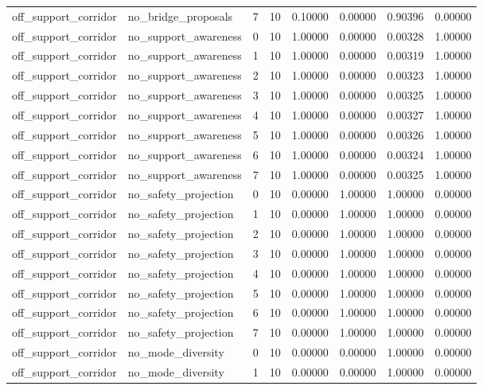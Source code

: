 \documentclass{article}
\begin{document}
\begin{table}[tbp]
{\begin{tabular}{llllllll}
off\_support\_corridor & no\_bridge\_proposals & 7 & 10 & 0.10000 & 0.00000 & 0.90396 & 0.00000 \\
off\_support\_corridor & no\_support\_awareness & 0 & 10 & 1.00000 & 0.00000 & 0.00328 & 1.00000 \\
off\_support\_corridor & no\_support\_awareness & 1 & 10 & 1.00000 & 0.00000 & 0.00319 & 1.00000 \\
off\_support\_corridor & no\_support\_awareness & 2 & 10 & 1.00000 & 0.00000 & 0.00323 & 1.00000 \\
off\_support\_corridor & no\_support\_awareness & 3 & 10 & 1.00000 & 0.00000 & 0.00325 & 1.00000 \\
off\_support\_corridor & no\_support\_awareness & 4 & 10 & 1.00000 & 0.00000 & 0.00327 & 1.00000 \\
off\_support\_corridor & no\_support\_awareness & 5 & 10 & 1.00000 & 0.00000 & 0.00326 & 1.00000 \\
off\_support\_corridor & no\_support\_awareness & 6 & 10 & 1.00000 & 0.00000 & 0.00324 & 1.00000 \\
off\_support\_corridor & no\_support\_awareness & 7 & 10 & 1.00000 & 0.00000 & 0.00325 & 1.00000 \\
off\_support\_corridor & no\_safety\_projection & 0 & 10 & 0.00000 & 1.00000 & 1.00000 & 0.00000 \\
off\_support\_corridor & no\_safety\_projection & 1 & 10 & 0.00000 & 1.00000 & 1.00000 & 0.00000 \\
off\_support\_corridor & no\_safety\_projection & 2 & 10 & 0.00000 & 1.00000 & 1.00000 & 0.00000 \\
off\_support\_corridor & no\_safety\_projection & 3 & 10 & 0.00000 & 1.00000 & 1.00000 & 0.00000 \\
off\_support\_corridor & no\_safety\_projection & 4 & 10 & 0.00000 & 1.00000 & 1.00000 & 0.00000 \\
off\_support\_corridor & no\_safety\_projection & 5 & 10 & 0.00000 & 1.00000 & 1.00000 & 0.00000 \\
off\_support\_corridor & no\_safety\_projection & 6 & 10 & 0.00000 & 1.00000 & 1.00000 & 0.00000 \\
off\_support\_corridor & no\_safety\_projection & 7 & 10 & 0.00000 & 1.00000 & 1.00000 & 0.00000 \\
off\_support\_corridor & no\_mode\_diversity & 0 & 10 & 0.00000 & 0.00000 & 1.00000 & 0.00000 \\
off\_support\_corridor & no\_mode\_diversity & 1 & 10 & 0.00000 & 0.00000 & 1.00000 & 0.00000 \\
\bottomrule
\end{tabular}
}
\end{table}
\end{document}
